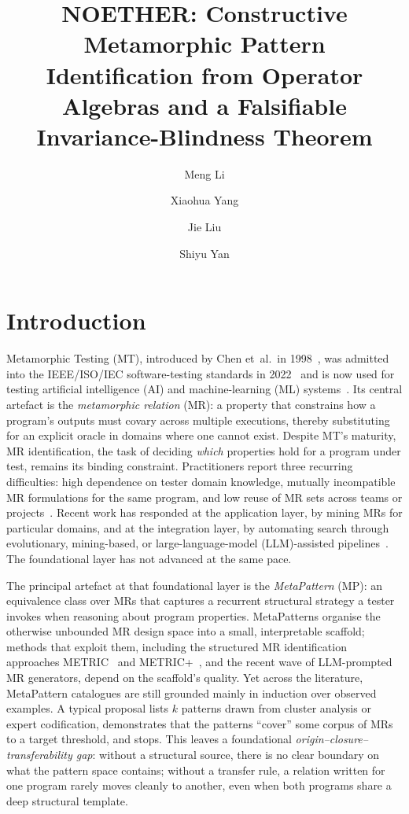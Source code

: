 \documentclass[acmsmall,screen,review]{acmart}
\title{NOETHER: Constructive Metamorphic Pattern Identification from Operator Algebras and a Falsifiable Invariance-Blindness Theorem}
\affiliation{%
    \institution{School of Computing, University of South China}
    \city{Hengyang}
    \postcode{421001}
    \country{China}
  }%
\affiliation{%
    \institution{Hunan Engineering Research Center of Software Evaluation and Testing for Intellectual Equipment}
    \city{Hengyang}
    \postcode{421001}
    \country{China}
  }%
\affiliation{%
    \institution{CNNC Key Laboratory on High Trusted Computing}
    \city{Hengyang}
    \postcode{421001}
    \country{China}
  }%
\author{Meng Li}
\author{Xiaohua Yang}
\author{Jie Liu}
\author{Shiyu Yan}
\begin{document}
\maketitle

\section{Introduction}
\label{sec:intro}

Metamorphic Testing (MT), introduced by Chen et~al.\ in 1998~\cite{Chen1998}, was admitted into the IEEE/ISO/IEC software-testing standards in 2022~\cite{ISO29119} and is now used for testing artificial intelligence (AI) and machine-learning (ML) systems~\cite{Segura2016, LiTOSEM2025}. Its central artefact is the \emph{metamorphic relation} (MR): a property that constrains how a program's outputs must covary across multiple executions, thereby substituting for an explicit oracle in domains where one cannot exist. Despite MT's maturity, MR identification, the task of deciding \emph{which} properties hold for a program under test, remains its binding constraint. Practitioners report three recurring difficulties: high dependence on tester domain knowledge, mutually incompatible MR formulations for the same program, and low reuse of MR sets across teams or projects~\cite{Segura2016, LiTOSEM2025}. Recent work has responded at the application layer, by mining MRs for particular domains, and at the integration layer, by automating search through evolutionary, mining-based, or large-language-model (LLM)-assisted pipelines~\cite{MRScout2024, GenMorph2024, Shin2024}. The foundational layer has not advanced at the same pace.

The principal artefact at that foundational layer is the \emph{MetaPattern} (MP): an equivalence class over MRs that captures a recurrent structural strategy a tester invokes when reasoning about program properties. MetaPatterns organise the otherwise unbounded MR design space into a small, interpretable scaffold; methods that exploit them, including the structured MR identification approaches METRIC~\cite{ChenMETRIC2016} and METRIC+~\cite{SunMETRICplus2021}, and the recent wave of LLM-prompted MR generators, depend on the scaffold's quality. Yet across the literature, MetaPattern catalogues are still grounded mainly in induction over observed examples. A typical proposal lists $k$ patterns drawn from cluster analysis or expert codification, demonstrates that the patterns ``cover'' some corpus of MRs to a target threshold, and stops. This leaves a foundational \emph{origin--closure--transferability gap}: without a structural source, there is no clear boundary on what the pattern space contains; without a transfer rule, a relation written for one program rarely moves cleanly to another, even when both programs share a deep structural template.
\end{document}
